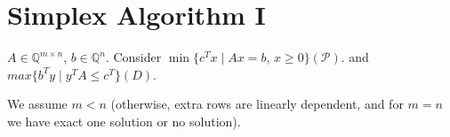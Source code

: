 \documentclass[main]{subfiles}
\begin{document}

\section{Simplex Algorithm I}

$A \in \mathbb{Q}^{m \times n}$, $b \in \mathbb{Q}^n$. Consider $\min \{c^T x 
\mid Ax = b$, $x \geq 0 \} (\mathcal{P})$. and $max \{b^T y \mid y^T A \leq c^T 
\}(D)$.

We assume $m < n$ (otherwise, extra rows are linearly dependent, and for $m=n$ we have exact one solution or no solution).
\end{document}
